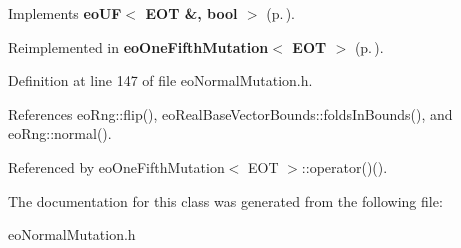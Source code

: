 Implements {\bf eo\-UF$<$ EOT \&, bool $>$} {\rm (p.\,\pageref{classeo_u_f_a1})}.

Reimplemented in {\bf eo\-One\-Fifth\-Mutation$<$ EOT $>$} {\rm (p.\,\pageref{classeo_one_fifth_mutation_a2})}.

Definition at line 147 of file eo\-Normal\-Mutation.h.

References eo\-Rng::flip(), eo\-Real\-Base\-Vector\-Bounds::folds\-In\-Bounds(), and eo\-Rng::normal().

Referenced by eo\-One\-Fifth\-Mutation$<$ EOT $>$::operator()().

The documentation for this class was generated from the following file:\begin{CompactItemize}
\item 
eo\-Normal\-Mutation.h\end{CompactItemize}
